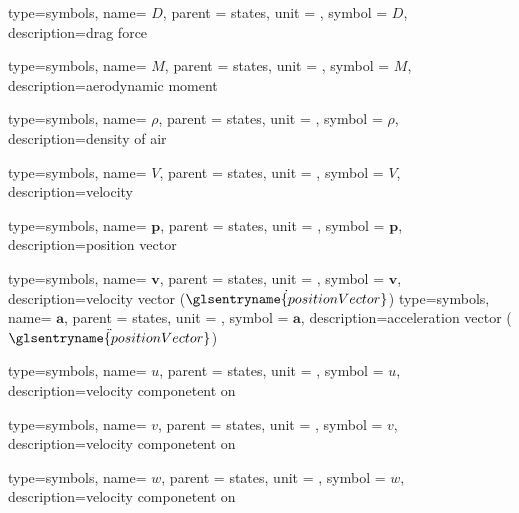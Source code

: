 {type=symbols,
    name= \ensuremath{D},
    parent = {states},
    unit = \unexpanded{\si{\newton}},
    symbol = \ensuremath{D},
    description={drag force}
}

{type=symbols,
    name= \ensuremath{M},
    parent = {states},
    unit = \unexpanded{\si{\newton\meter}},
    symbol = \ensuremath{M},
    description={aerodynamic moment}
}

{type=symbols,
    name= \ensuremath{\rho},
    parent = {states},
    unit = \unexpanded{\si{\kilogram\per\meter\cubed}},
    symbol = \ensuremath{\rho},
    description={density of air}
}

{type=symbols,
    name= \ensuremath{V},
    parent = {states},
    unit = \unexpanded{\si{\meter\per\second}},
    symbol = \ensuremath{V},
    description={velocity}
}

{type=symbols,
    name= \ensuremath{\mathbf{p}},
    parent = {states},
    unit = \unexpanded{\si{\meter}},
    symbol = \ensuremath{\mathbf{p}},
    description={position vector}
}

{type=symbols,
    name= \ensuremath{\mathbf{v}},
    parent = {states},
    unit = \unexpanded{\si{\meter\per\second}},
    symbol = \ensuremath{\mathbf{v}},
    description={velocity vector ($\dot{\glsentryname{positionVector}}$)}
}
{type=symbols,
    name= \ensuremath{\mathbf{a}},
    parent = {states},
    unit = \unexpanded{\si{\meter\per\second\squared}},
    symbol = \ensuremath{\mathbf{a}},
    description={acceleration vector ($\ddot{\glsentryname{positionVector}}$)}
}


{type=symbols,
    name= \ensuremath{u},
    parent = {states},
    unit = \unexpanded{\si{\meter\per\second}},
    symbol = \ensuremath{u},
    description={velocity componetent on }
}

{type=symbols,
    name= \ensuremath{v},
    parent = {states},
    unit = \unexpanded{\si{\meter\per\second}},
    symbol = \ensuremath{v},
    description={velocity componetent on }
}

{type=symbols,
    name= \ensuremath{w},
    parent = {states},
    unit = \unexpanded{\si{\meter\per\second}},
    symbol = \ensuremath{w},
    description={velocity componetent on }
}


